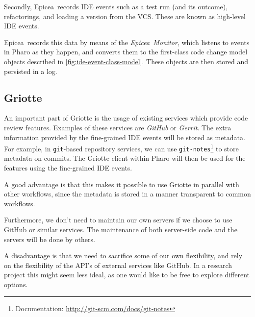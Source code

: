 \documentclass[conference,a4paper]{IEEEtran}
\newcommand{\Ep}{Epicea}
\newcommand{\code}[1]{\texttt{#1}}
\begin{document}
Secondly, \Ep\ records IDE events such as a test run (and its
outcome), refactorings, and loading a version from the VCS. These are
known as high-level IDE events.

\Ep\ records this data by means of the \textit{\Ep\ Monitor}, which
listens to events in Pharo as they happen, and converts them to the
first-class code change model objects described in
\cref{fig:ide-event-class-model}. These objects are then stored and
persisted in a log.

\subsection{Griotte}
\label{sec:griotte}

An important part of Griotte is the usage of existing services which
provide code review features. Examples of these services are
\textit{GitHub} or \textit{Gerrit}. The extra information provided by
the fine-grained IDE events will be stored as metadata. For example,
in \code{git}-based repository services, we can use
\code{git-notes}\footnote{Documentation:
  \url{http://git-scm.com/docs/git-notes}} to store metadata on
commits. The Griotte client within Pharo will then be used for the
features using the fine-grained IDE events.

A good advantage is that this makes it possible to use Griotte in
parallel with other workflows, since the metadata is stored in a
manner transparent to common workflows.

Furthermore, we don't need to maintain our own servers if we choose to
use GitHub or similar services. The maintenance of both server-side
code and the servers will be done by others.

A disadvantage is that we need to sacrifice some of our own
flexibility, and rely on the flexibility of the API's of external
services like GitHub. In a research project this might seem less
ideal, as one would like to be free to explore different
options.
\end{document}

